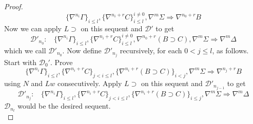 \begin{proof}
  $$\{\nabla^{n_i} \Gamma\}_{i \leq l}, \{\nabla^{n_i+r}C\}_{i \leq l}^{i \neq 0} , \nabla^m \Sigma \Rightarrow \nabla^{n_0+r} B$$
  Now we can apply $L \supset$ on this sequent and $\mathcal{D}'$ to get
  $$\mathcal{D}'_{n_0}:~~~~\{\nabla^{n_i} \Gamma\}_{i \leq l}, \{\nabla^{n_i+r}C\}_{i \leq l}^{i \neq 0}, \nabla^{n_0+r} (B \supset C) , \nabla^m \Sigma \Rightarrow \nabla^m \Delta$$
  which we call $\mathcal{D}'_{n_0}$. Now define $\mathcal{D}'_{n_j}$ recursively, for each $0 < j \leq l$, as follows. Start with $\mathcal{D}_0'$. Prove
  $$\{\nabla^{n_i} \Gamma\}_{i \leq l}, \{\nabla^{n_i+r}C\}_{j < i \leq l}, \{ \nabla^{n_i+r} (B \supset C) \}_{i < j}, \nabla^m \Sigma \Rightarrow \nabla^{n_j+r} B$$
  using $N$ and $Lw$ consecutively. Apply $L \supset$ on this sequent and $\mathcal{D}'_{n_{j-1}}$ to get
  $$\mathcal{D}'_{n_j}:~~~~\{\nabla^{n_i} \Gamma\}_{i \leq l}, \{\nabla^{n_i+r}C\}_{j < i \leq l}, \{ \nabla^{n_i+r} (B \supset C) \}_{i \leq j}, \nabla^m \Sigma \Rightarrow \nabla^m \Delta$$
  $\mathcal{D}_{n_l}$ would be the desired sequent.\\
\end{proof}